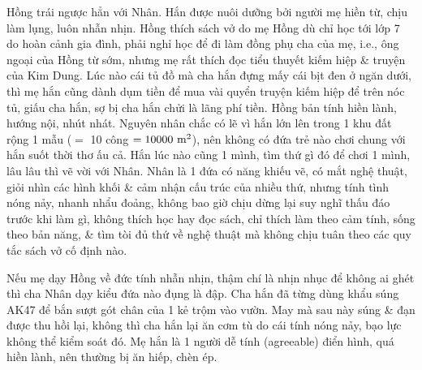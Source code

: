\documentclass[12pt,oneside]{book}
\begin{document}
{\sf Hồng} trái ngược hẳn với {\sf Nhân}. Hắn được nuôi dưỡng bởi người mẹ hiền từ, chịu làm lụng, luôn nhẫn nhịn. {\sf Hồng} thích sách vở do mẹ {\sf Hồng} dù chỉ học tới lớp 7 do hoàn cảnh gia đình, phải nghỉ học để đi làm đồng phụ cha của mẹ, i.e., ông ngoại của {\sf Hồng} từ sớm, nhưng mẹ rất thích đọc tiểu thuyết kiếm hiệp \& truyện của {\sc Kim Dung}. Lúc nào cái tủ đồ mà cha hắn đựng mấy cái bịt đen ở ngăn dưới, thì mẹ hắn cũng dành dụm tiền để mua vài quyển truyện kiếm hiệp để trên nóc tủ, giấu cha hắn, sợ bị cha hắn chửi là lãng phí tiền. {\sf Hồng} bản tính hiền lành, hướng nội, nhút nhát. Nguyên nhân chắc có lẽ vì hắn lớn lên trong 1 khu đất rộng 1 mẫu ($=$ 10 công $= 10000\ {\rm m}^2$), nên không có đứa trẻ nào chơi chung với hắn suốt thời thơ ấu cả. Hắn lúc nào cũng 1 mình, tìm thứ gì đó để chơi 1 mình, lâu lâu thì vẽ vời với {\sf Nhân}. {\sf Nhân} là 1 đứa có năng khiếu vẽ, có mắt nghệ thuật, giỏi nhìn các hình khối \& cảm nhận cấu trúc của nhiều thứ, nhưng tính tình nóng nảy, nhanh nhẩu đoảng, không bao giờ chịu dừng lại suy nghĩ thấu đáo trước khi làm gì, không thích học hay đọc sách, chỉ thích làm theo cảm tính, sống theo bản năng, \& tìm tòi đủ thứ về nghệ thuật mà không chịu tuân theo các quy tắc sách vở cố định nào.

Nếu mẹ dạy {\sf Hồng} về đức tính nhẫn nhịn, thậm chí là nhịn nhục để không ai ghét thì cha {\sf Nhân} dạy kiểu đứa nào đụng là đập. Cha hắn đã từng dùng khẩu súng AK47 để bắn sượt gót chân của 1 kẻ trộm vào vườn. May mà sau này súng \& đạn được thu hồi lại, không thì cha hắn lại ăn cơm tù do cái tính nóng nảy, bạo lực không thể kiểm soát đó. Mẹ hắn là 1 người dễ tính (agreeable) điển hình, quá hiền lành, nên thường bị ăn hiếp, chèn ép. 
\end{document}
